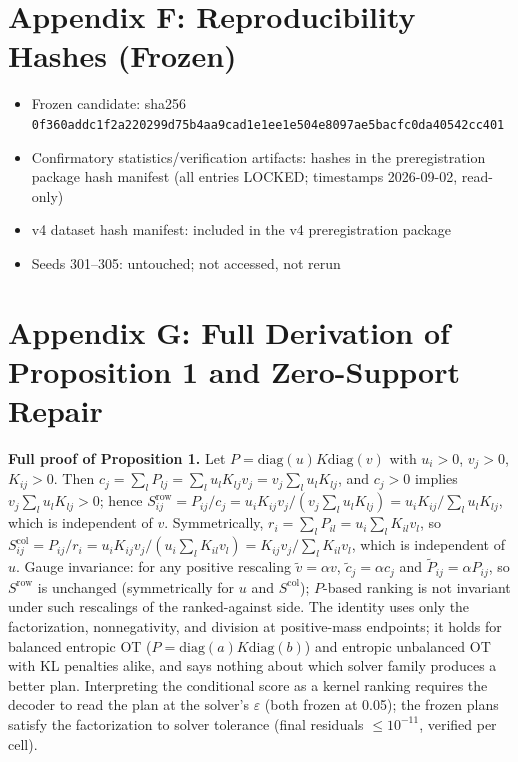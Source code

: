 \documentclass[journal]{IEEEtran}
\begin{document}
\section*{Appendix F: Reproducibility Hashes (Frozen)}

\begin{itemize}
\item Frozen candidate: sha256 \texttt{0f360add\-c1f2a220\-299d75b4\-aa9cad1e\-1ee1e504\-e8097ae5\-bacfc0da\-40542cc401}
\item Confirmatory statistics/verification artifacts: hashes in the preregistration package hash manifest (all entries LOCKED; timestamps 2026-09-02, read-only)
\item v4 dataset hash manifest: included in the v4 preregistration package
\item Seeds 301--305: untouched; not accessed, not rerun
\end{itemize}

\section*{Appendix G: Full Derivation of Proposition 1 and Zero-Support Repair}

\textbf{Full proof of Proposition 1.} Let $P=\mathrm{diag}(u)K\mathrm{diag}(v)$ with $u_i>0$, $v_j>0$, $K_{ij}>0$. Then $c_j=\sum_l P_{lj}=\sum_l u_l K_{lj} v_j=v_j\sum_l u_l K_{lj}$, and $c_j>0$ implies $v_j\sum_l u_l K_{lj}>0$; hence $S^{\mathrm{row}}_{ij}=P_{ij}/c_j=u_i K_{ij}v_j/(v_j\sum_l u_l K_{lj})=u_i K_{ij}/\sum_l u_l K_{lj}$, which is independent of $v$. Symmetrically, $r_i=\sum_l P_{il}=u_i\sum_l K_{il}v_l$, so $S^{\mathrm{col}}_{ij}=P_{ij}/r_i=u_i K_{ij}v_j/(u_i\sum_l K_{il}v_l)=K_{ij}v_j/\sum_l K_{il}v_l$, which is independent of $u$. Gauge invariance: for any positive rescaling $\tilde v=\alpha v$, $\tilde c_j=\alpha c_j$ and $\tilde P_{ij}=\alpha P_{ij}$, so $S^{\mathrm{row}}$ is unchanged (symmetrically for $u$ and $S^{\mathrm{col}}$); $P$-based ranking is not invariant under such rescalings of the ranked-against side. The identity uses only the factorization, nonnegativity, and division at positive-mass endpoints; it holds for balanced entropic OT ($P=\mathrm{diag}(a)K\mathrm{diag}(b)$) and entropic unbalanced OT with KL penalties alike, and says nothing about which solver family produces a better plan. Interpreting the conditional score as a kernel ranking requires the decoder to read the plan at the solver's $\varepsilon$ (both frozen at 0.05); the frozen plans satisfy the factorization to solver tolerance (final residuals $\le 10^{-11}$, verified per cell).
\end{document}
